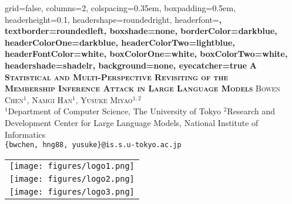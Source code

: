 \documentclass[a0paper,portrait]{baposter}
\begin{document}
\begin{poster}{
  grid=false,
  columns=2,
  colspacing=0.35em,
  boxpadding=0.5em,
  headerheight=0.1\textheight,
  headershape=roundedright,
  headerfont=\Large\bf\textsc,
  textborder=roundedleft,
  boxshade=none,
  borderColor=darkblue,
  headerColorOne=darkblue,
  headerColorTwo=lightblue,
  headerFontColor=white,
  boxColorOne=white,
  boxColorTwo=white,
  headershade=shadelr,
  background=none,
  eyecatcher=true
}
{}
{\Large\bf\textsc{A Statistical and Multi-Perspective Revisiting of the\\Membership Inference Attack in Large Language Models}\vspace{0.2em}}
{\normalsize\textsc{Bowen Chen$^{1}$, Namgi Han$^{1}$, Yusuke Miyao$^{1,2}$}\vspace{0.15em}\\
\small $^1$Department of Computer Science, The University of Tokyo \quad $^2$Research and Development Center for Large Language Models, National Institute of Informatics\\
\small\texttt{\{bwchen, hng88, yusuke\}@is.s.u-tokyo.ac.jp}
}
{\begin{tabular}{l}
\texttt{[image: figures/logo1.png]} \\
\texttt{[image: figures/logo2.png]} \\
\texttt{[image: figures/logo3.png]}
\end{tabular}}

\end{poster}
\end{document}
